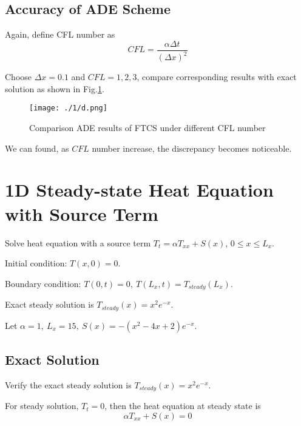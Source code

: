 \documentclass[12pt,a4paper]{article} %
\begin{document}
\begin{CJK}{UTF8}{song}

\subsection{Accuracy of ADE Scheme}
Again, define CFL number as
\begin{equation}
CFL=\frac{\alpha \Delta t}{(\Delta x)^{2}}
\end{equation}

Choose $\Delta x=0.1$ and $CFL=1, 2, 3$, compare corresponding results with exact solution as shown in Fig.\ref{Fig.1-d}.
\begin{figure}[htbp]
\centering
{
    \texttt{[image: ./1/d.png]}
}
\caption{Comparison ADE results of FTCS under different CFL number} \label{Fig.1-d}
\end{figure}
We can found, as $CFL$ number increase, the discrepancy becomes noticeable.


\newpage
\section{1D Steady-state Heat Equation with Source Term}

Solve heat equation with a source term $T_{t}=\alpha T_{xx} +S(x)$, $0 \leq x \leq L_{x}$.

Initial condition: $T(x,0)=0$.

Boundary condition: $T(0,t)=0,\ T(L_{x},t)=T_{steady}(L_{x})$.

Exact steady solution is $T_{steady}(x)=x^{2}e^{-x}$.

Let $\alpha=1,\ L_{x}=15,\ S(x)=-(x^{2}-4x+2)e^{-x}$.

\subsection{Exact Solution}
Verify the exact steady solution is $T_{steady}(x)=x^{2}e^{-x}$.

For steady solution, $T_{t}=0$, then the heat equation at steady state is
\begin{equation}
\alpha T_{xx} +S(x) = 0
\end{equation}


\end{CJK}
\end{document}
